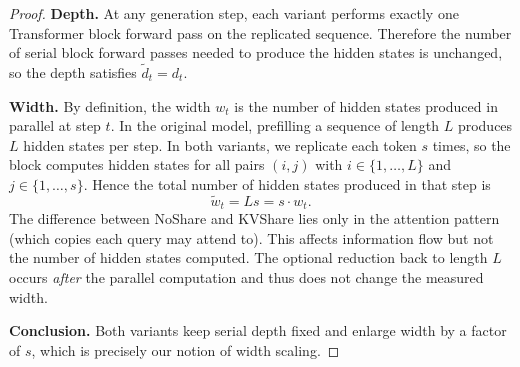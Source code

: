 \documentclass{article} %
\theoremstyle{definition}
\theoremstyle{plain}
\begin{document}
\begin{proof}
\textbf{Depth.}  
At any generation step, each variant performs exactly one Transformer block forward pass 
on the replicated sequence. 
Therefore the number of serial block forward passes needed to produce the hidden states is unchanged, 
so the depth satisfies $\tilde d_t = d_t$.

\textbf{Width.}  
By definition, the width $w_t$ is the number of hidden states produced in parallel at step $t$.  
In the original model, prefilling a sequence of length $L$ produces $L$ hidden states per step.  
In both variants, we replicate each token $s$ times, so the block computes hidden states for 
all pairs $(i,j)$ with $i \in \{1,\dots,L\}$ and $j \in \{1,\dots,s\}$.  
Hence the total number of hidden states produced in that step is
\[
\tilde w_t = Ls = s \cdot w_t.
\]
The difference between \textsf{NoShare} and \textsf{KVShare} lies only in the 
attention pattern (which copies each query may attend to). 
This affects information flow but not the number of hidden states computed.  
The optional reduction back to length $L$ occurs \emph{after} the parallel computation 
and thus does not change the measured width.

\textbf{Conclusion.}  
Both variants keep serial depth fixed and enlarge width by a factor of $s$, 
which is precisely our notion of width scaling.
\end{proof}
\end{document}
